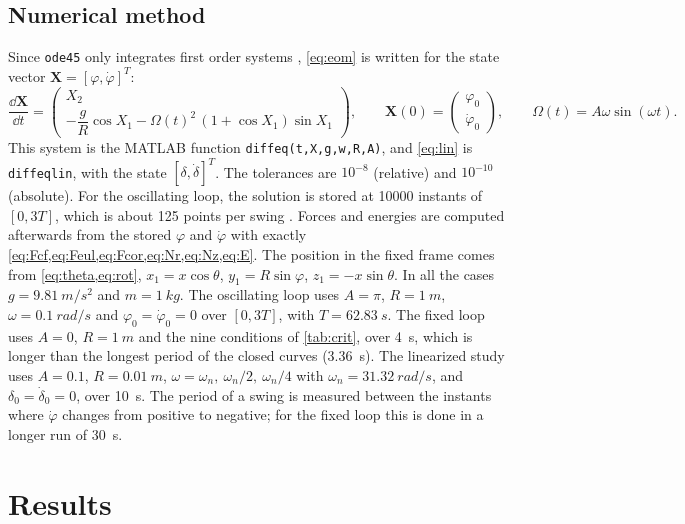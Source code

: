 \documentclass[11pt,a4paper]{article}
\newcommand{\dt}[1]{\dot{#1}}
\begin{document}
\subsection{Numerical method}
Since \texttt{ode45} only integrates first order systems \cite{matlab}, \cref{eq:eom} is written for the state vector $\bm X=[\varphi,\dt\varphi]^T$:
\begin{equation}
\frac{\dd\bm X}{\dd t}=\begin{pmatrix}X_2\\[2pt] -\dfrac gR\cos X_1-\Omega(t)^2\,(1+\cos X_1)\sin X_1\end{pmatrix},\qquad \bm X(0)=\begin{pmatrix}\varphi_0\\ \dt\varphi_0\end{pmatrix},\qquad \Omega(t)=A\omega\sin(\omega t).
\label{eq:system}
\end{equation}
This system is the MATLAB function \texttt{diffeq(t,X,g,w,R,A)}, and \cref{eq:lin} is \texttt{diffeqlin}, with the state $[\delta,\dt\delta]^T$. The tolerances are $10^{-8}$ (relative) and $10^{-10}$ (absolute). For the oscillating loop, the solution is stored at \num{10000} instants of $[0,3T]$, which is about 125 points per swing \cite{guidelines}. Forces and energies are computed afterwards from the stored $\varphi$ and $\dt\varphi$ with exactly \cref{eq:Fcf,eq:Feul,eq:Fcor,eq:Nr,eq:Nz,eq:E}. The position in the fixed frame comes from \cref{eq:theta,eq:rot}, $x_1=x\cos\theta$, $y_1=R\sin\varphi$, $z_1=-x\sin\theta$. In all the cases $g=\SI{9.81}{m/s^2}$ and $m=\SI{1}{kg}$. The oscillating loop uses $A=\pi$, $R=\SI{1}{m}$, $\omega=\SI{0.1}{rad/s}$ and $\varphi_0=\dt\varphi_0=0$ over $[0,3T]$, with $T=\SI{62.83}{s}$. The fixed loop uses $A=0$, $R=\SI{1}{m}$ and the nine conditions of \cref{tab:crit}, over \SI{4}{s}, which is longer than the longest period of the closed curves (\SI{3.36}{s}). The linearized study uses $A=0.1$, $R=\SI{0.01}{m}$, $\omega=\omega_n,\ \omega_n/2,\ \omega_n/4$ with $\omega_n=\SI{31.32}{rad/s}$, and $\delta_0=\dt\delta_0=0$, over \SI{10}{s}. The period of a swing is measured between the instants where $\dt\varphi$ changes from positive to negative; for the fixed loop this is done in a longer run of \SI{30}{s}.

\section{Results}\label{sec:results}
\end{document}
